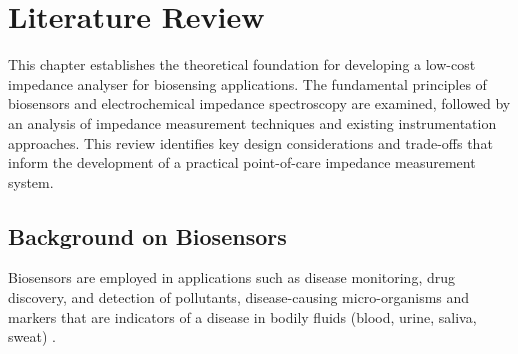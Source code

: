 \graphicspath{{literature_review/fig/}}

\chapter{Literature Review}
This chapter establishes the theoretical foundation for developing a low-cost impedance analyser for biosensing applications. The fundamental principles of biosensors and electrochemical impedance spectroscopy are examined, followed by an analysis of impedance measurement techniques and existing instrumentation approaches. This review identifies key design considerations and trade-offs that inform the development of a practical point-of-care impedance measurement system.
\section{Background on Biosensors}
Biosensors are employed in applications such as disease monitoring, drug discovery, and detection of pollutants, disease-causing micro-organisms and markers that are indicators of a disease in bodily fluids (blood, urine, saliva, sweat) \cite{bhallaIntroductionBiosensors2016}. 



